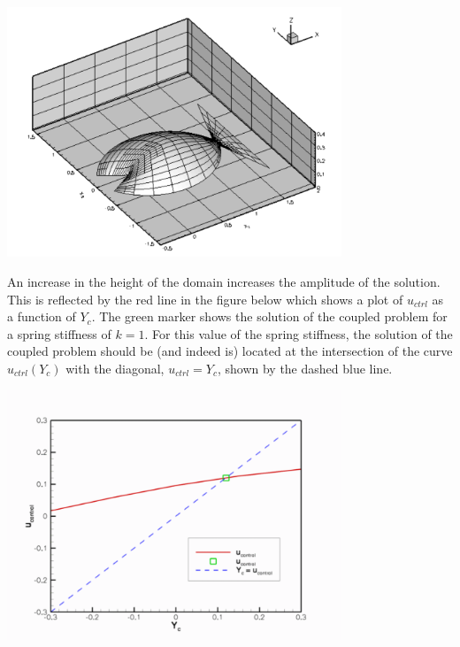  
\begin{DoxyImage}
\includegraphics[width=0.75\textwidth]{elastic_fish}
\end{DoxyImage}


An increase in the height of the domain increases the amplitude of the solution. This is reflected by the red line in the figure below which shows a plot of $ u_{ctrl} $ as a function of $ Y_c $. The green marker shows the solution of the coupled problem for a spring stiffness of $ k=1 $. For this value of the spring stiffness, the solution of the coupled problem should be (and indeed is) located at the intersection of the curve $ u_{ctrl}(Y_c) $ with the diagonal, $ u_{ctrl} = Y_c $, shown by the dashed blue line.

 
\begin{DoxyImage}
\includegraphics[width=0.75\textwidth]{trace}
\end{DoxyImage}




